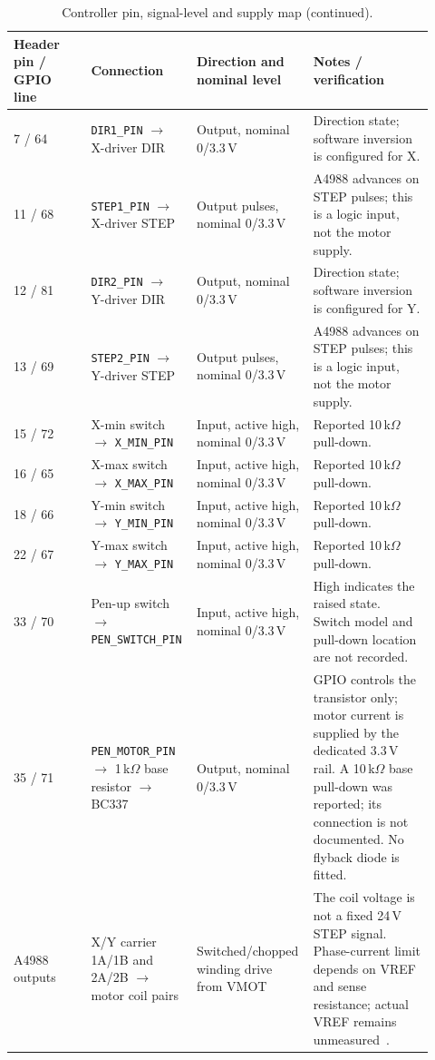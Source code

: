 \begin{table}[!htbp]\ContinuedFloat\centering\small
\setlength{\tabcolsep}{3pt}\renewcommand{\arraystretch}{1.03}
\begin{tabular}{p{0.18\linewidth}p{0.22\linewidth}p{0.23\linewidth}p{0.29\linewidth}}\toprule
\textbf{Header pin / GPIO line} & \textbf{Connection} & \textbf{Direction and nominal level} & \textbf{Notes / verification}\\\midrule
7 / 64 & \texttt{DIR1\_PIN} $\rightarrow$ X-driver DIR & Output, nominal 0/3.3\,V & Direction state; software inversion is configured for X.\\
11 / 68 & \texttt{STEP1\_PIN} $\rightarrow$ X-driver STEP & Output pulses, nominal 0/3.3\,V & A4988 advances on STEP pulses; this is a logic input, not the motor supply.\\
12 / 81 & \texttt{DIR2\_PIN} $\rightarrow$ Y-driver DIR & Output, nominal 0/3.3\,V & Direction state; software inversion is configured for Y.\\
13 / 69 & \texttt{STEP2\_PIN} $\rightarrow$ Y-driver STEP & Output pulses, nominal 0/3.3\,V & A4988 advances on STEP pulses; this is a logic input, not the motor supply.\\
15 / 72 & X-min switch $\rightarrow$ \texttt{X\_MIN\_PIN} & Input, active high, nominal 0/3.3\,V & Reported 10\,k$\Omega$ pull-down.\\
16 / 65 & X-max switch $\rightarrow$ \texttt{X\_MAX\_PIN} & Input, active high, nominal 0/3.3\,V & Reported 10\,k$\Omega$ pull-down.\\
18 / 66 & Y-min switch $\rightarrow$ \texttt{Y\_MIN\_PIN} & Input, active high, nominal 0/3.3\,V & Reported 10\,k$\Omega$ pull-down.\\
22 / 67 & Y-max switch $\rightarrow$ \texttt{Y\_MAX\_PIN} & Input, active high, nominal 0/3.3\,V & Reported 10\,k$\Omega$ pull-down.\\
33 / 70 & Pen-up switch $\rightarrow$ \texttt{PEN\_SWITCH\_PIN} & Input, active high, nominal 0/3.3\,V & High indicates the raised state. Switch model and pull-down location are not recorded.\\
35 / 71 & \texttt{PEN\_MOTOR\_PIN} $\rightarrow$ 1\,k$\Omega$ base resistor $\rightarrow$ BC337 & Output, nominal 0/3.3\,V & GPIO controls the transistor only; motor current is supplied by the dedicated 3.3\,V rail. A 10\,k$\Omega$ base pull-down was reported; its connection is not documented. No flyback diode is fitted.\\
A4988 outputs & X/Y carrier 1A/1B and 2A/2B $\rightarrow$ motor coil pairs & Switched/chopped winding drive from VMOT & The coil voltage is not a fixed 24\,V STEP signal. Phase-current limit depends on VREF and sense resistance; actual VREF remains unmeasured~\cite[pp.~4--5, 9]{a4988ds}.\\
\bottomrule\end{tabular}
\caption{Controller pin, signal-level and supply map (continued).}
\end{table}
\FloatBarrier
